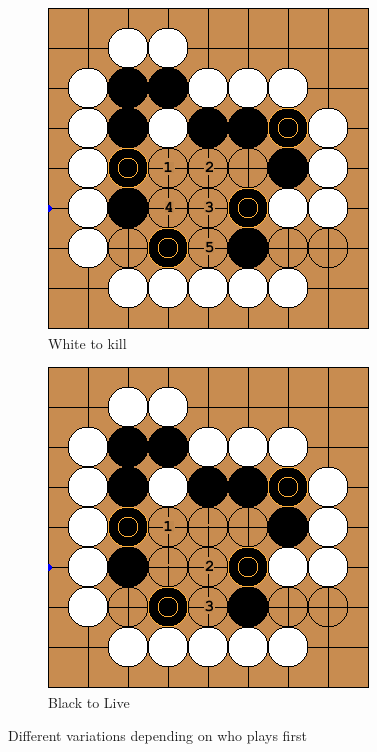 \documentclass{l4proj}
\begin{document}
\begin{figure}[!ht]
\centering
\begin{subfigure}[b]{0.40\textwidth}
\centering
\includegraphics[width=\textwidth]{ep2/1a.png}
\caption{ White to kill}
\label{fig:ep2-b}
\end{subfigure}
\begin{subfigure}[b]{0.40\textwidth}
\centering
\includegraphics[width=\textwidth]{ep2/1b.png}
\caption{Black to Live }
\label{fig:ep2-a}
\end{subfigure}
\caption{Different variations depending on who plays first }
\label{fig:ep2}
\end{figure}
\end{document}
